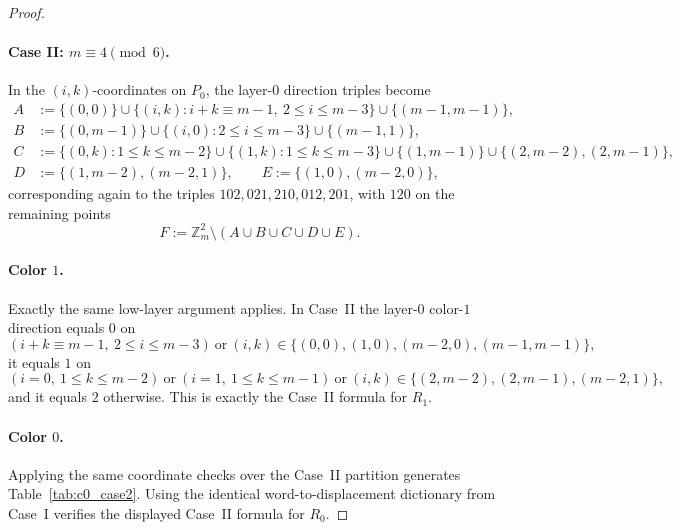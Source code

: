 \documentclass[11pt]{article}
\begin{document}
\begin{proof}
\paragraph{Case II: $m\equiv 4\pmod 6$.}
In the $(i,k)$-coordinates on $P_0$, the layer-$0$ direction triples become
\begin{align*}
A&:=\{(0,0)\}\cup\{(i,k):i+k\equiv m-1,\ 2\le i\le m-3\}\cup\{(m-1,m-1)\},\\
B&:=\{(0,m-1)\}\cup\{(i,0):2\le i\le m-3\}\cup\{(m-1,1)\},\\
C&:=\{(0,k):1\le k\le m-2\}\cup\{(1,k):1\le k\le m-3\}\cup\{(1,m-1)\}\cup\{(2,m-2),(2,m-1)\},\\
D&:=\{(1,m-2),(m-2,1)\},\qquad E:=\{(1,0),(m-2,0)\},
\end{align*}
corresponding again to the triples $102,021,210,012,201$, with $120$ on the remaining points
\[
F:=\mathbb Z_m^2\setminus (A\cup B\cup C\cup D\cup E).
\]

\paragraph{Color $1$.}
Exactly the same low-layer argument applies.
In Case~II the layer-$0$ color-$1$ direction equals $0$ on
\[
(i+k\equiv m-1,\ 2\le i\le m-3)\ \text{or}\ (i,k)\in\{(0,0),(1,0),(m-2,0),(m-1,m-1)\},
\]
it equals $1$ on
\[
(i=0,\ 1\le k\le m-2)\ \text{or}\ (i=1,\ 1\le k\le m-1)\ \text{or}\ (i,k)\in\{(2,m-2),(2,m-1),(m-2,1)\},
\]
and it equals $2$ otherwise.
This is exactly the Case~II formula for $R_1$.

\paragraph{Color $0$.}
Applying the same coordinate checks over the Case~II partition generates Table~\ref{tab:c0_case2}.
Using the identical word-to-displacement dictionary from Case~I verifies the displayed Case~II formula for $R_0$.


\end{proof}
\end{document}
